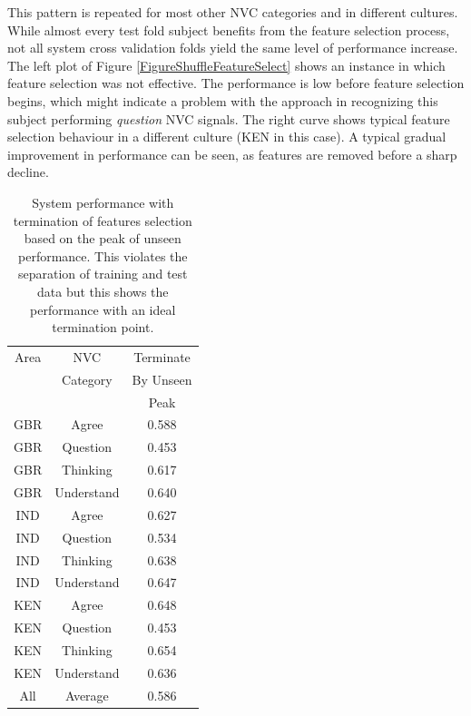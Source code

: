 This pattern is repeated for most other \ac{NVC} categories and in different cultures. While almost every test fold subject benefits from the feature selection process, not all system cross validation folds yield the same level of performance increase. The left plot of Figure \ref{FigureShuffleFeatureSelect} shows an instance in which feature selection was not effective. The performance is low before feature selection begins, which might indicate a problem with the approach in recognizing this subject performing \textit{question} \ac{NVC} signals. The right curve shows typical feature selection behaviour in a different culture (KEN in this case). A typical gradual improvement in performance can be seen, as features are removed before a sharp decline.

\begin{table}[htb]
\centering
\caption[System performance with termination of features selection based on the peak of unseen performance.]{System performance with termination of features selection based on the peak of unseen performance. This violates the separation of training and test data but this shows the performance with an ideal termination point.}
\begin{tabular}{ | c | c | c | }
\hline
Area & NVC      & Terminate \\
     & Category & By Unseen \\
     &          & Peak \\
\hline
GBR & Agree & 0.588 \\
GBR & Question & 0.453 \\
GBR & Thinking & 0.617 \\
GBR & Understand & 0.640 \\
\hline
IND & Agree & 0.627 \\
IND & Question & 0.534 \\
IND & Thinking & 0.638 \\
IND & Understand & 0.647 \\
\hline
KEN & Agree & 0.648 \\
KEN & Question & 0.453 \\
KEN & Thinking & 0.654 \\
KEN & Understand & 0.636 \\
\hline
All & Average & 0.586 \\
\hline
\end{tabular}
\label{TableShuffledFoldsTerminationOnUnseenCheat}
\end{table}

